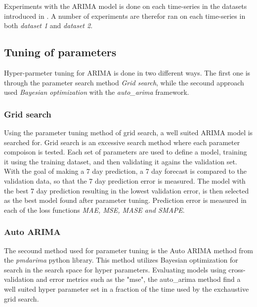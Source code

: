   Experiments with the ARIMA model is done on each time-series in the datasets introduced in .
  A number of experiments are therefor ran on each time-series in both \textit{dataset 1} and \textit{dataset 2}.


  \iffalse
    ARIMA models are first tuned on each time-series in order to make predicitons.
    The hyper-parmeters fond after the tuning is then used in order to created models capable of making predictions.
    The model attempts to make a 7 day ahead prediction.
  \fi

  \subsection{Tuning of parameters}
  Hyper-parmeter tuning for ARIMA is done in two different ways.
  The first one is through the parameter search method \textit{Grid search},
  while the secound approach used \textit{Bayesian optimization} with the \textit{auto\_arima} framework.

  \subsubsection*{Grid search}
  Using the parameter tuning method of grid search, a well suited ARIMA model is searched for.
  Grid search is an excessive search method where each parameter compoison is tested.
  Each set of parameters are  used to define a model, training it using the training dataset,
  and then validating it agains the validation set.
  With the goal of making a 7 day prediction, a 7 day forecast is compared to the validation data,
  so that the 7 day prediction error is measured.
  The model with the best 7 day prediction resulting in the lowest validation error,
  is then selected as the best model found after parameter tuning.
  Prediction error is measured in each of the loss functions \textit{MAE, MSE, MASE and SMAPE}.

  \subsubsection{Auto ARIMA}
  The secound method used for parameter tuning is the Auto ARIMA method from the \textit{pmdarima} python library.
  This method utilizes Bayesian optimization for search in the search space for hyper parameters.
  Evaluating models using cross-validation and error metrics such as the "mse",
  the auto\_arima method find a well suited hyper parameter set in a fraction of the time used by the exchaustive grid search.

